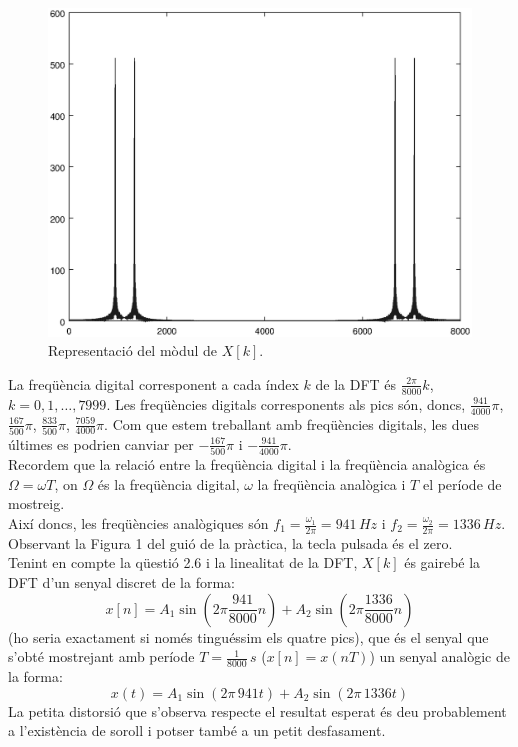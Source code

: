 \documentclass[11pt,a4]{article}
\numberwithin{equation}{section}
\theoremstyle{thmstyle}
\theoremstyle{thmstyle}
\theoremstyle{thmstyle}
\theoremstyle{thmstyle}
\theoremstyle{thmstyle}
\theoremstyle{thmstyle}
\theoremstyle{thmstyle}
\begin{document}
\begin{figure}
\includegraphics[scale=0.7]{moddft2.eps} 
\caption{Representació del mòdul de $X[k]$.}
\label{fig:moddft}
\end{figure}

La freqüència digital corresponent a cada índex $k$ de la DFT és $\frac{2\pi}{8000}k$, $k=0,1,\ldots, 7999$. Les freqüències digitals corresponents als pics són, doncs, $\frac{941}{4000}\pi$, $\frac{167}{500}\pi$, $\frac{833}{500}\pi$, $\frac{7059}{4000}\pi$. Com que estem treballant amb freqüències digitals, les dues últimes es podrien canviar per $-\frac{167}{500}\pi$ i $-\frac{941}{4000}\pi$.
\\

Recordem que la relació entre la freqüència digital i la freqüència analògica és $\Omega=\omega T$, on $\Omega$ és la freqüència digital, $\omega$ la freqüència analògica i $T$ el període de mostreig.
\\

Així doncs, les freqüències analògiques són $f_1=\frac{\omega_1}{2\pi}=941\, Hz$  i $f_2=\frac{\omega_2}{2\pi}=1336\, Hz$.
\\

Observant la Figura 1 del guió de la pràctica, la tecla pulsada és el zero.
\\

Tenint en compte la qüestió 2.6 i la linealitat de la DFT, $X[k]$ és gairebé la DFT d'un senyal discret de la forma:
$$
x[n] = A_1 \sin(2\pi\frac{941}{8000}n) + A_2 \sin(2\pi\frac{1336}{8000}n)
$$
(ho seria exactament si només tinguéssim els quatre pics), que és el senyal que s'obté mostrejant amb període $T=\frac{1}{8000}\,s$ ($x[n] = x(nT)$) un senyal analògic de la forma:
$$
x(t) = A_1 \sin(2\pi\, 941t) + A_2 \sin(2\pi\, 1336t)
$$
La petita distorsió que s'observa respecte el resultat esperat és deu probablement a l'existència de soroll i potser també a un petit desfasament.
\\
\end{document}
